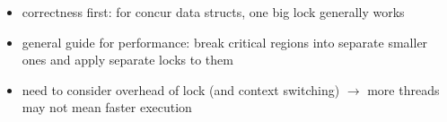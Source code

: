 \begin{itemize}
\item correctness first: for concur data structs, one big lock generally works
\item general guide for performance: break critical regions into separate smaller ones and apply separate locks to them
\item need to consider overhead of lock (and context switching) $\to$ more threads may not mean faster execution
\end{itemize}
